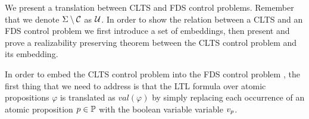 
We present a translation between CLTS and FDS control problems. Remember that we denote $\Sigma \setminus \mathcal{C}$ as $\mathcal{U}$. In order to show the relation between a CLTS and an FDS control problem we first introduce a set of embeddings, then present and prove a realizability preserving theorem between the CLTS control problem and its embedding.


In order to embed the CLTS control problem \controlProblemDef into the FDS control problem \fdsEmbeddingDef, the first thing that we need to address is that the LTL formula over atomic propositions $\varphi$ is translated as $val(\varphi)$ by simply  replacing each occurrence of an atomic proposition $p \in \mathbb{P}$ with the boolean variable variable $v_{p}$.
%	


